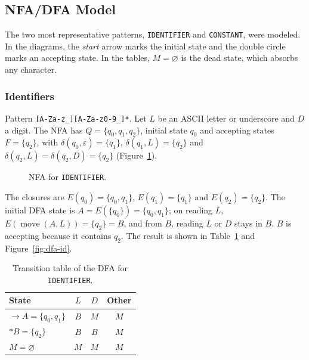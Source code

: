 \documentclass[11pt,letterpaper]{article}
\newcommand{\tok}[1]{\texttt{#1}}
\begin{document}
\subsection{NFA/DFA Model}

The two most representative patterns, \tok{IDENTIFIER} and \tok{CONSTANT},
were modeled. In the diagrams, the \emph{start} arrow marks the initial state
and the double circle marks an accepting state. In the tables,
$M=\varnothing$ is the dead state, which absorbs any character.

\subsubsection{Identifiers}

Pattern \texttt{[A-Za-z\_][A-Za-z0-9\_]*}. Let $L$ be an ASCII letter or
underscore and $D$ a digit. The NFA has $Q=\{q_0,q_1,q_2\}$, initial state
$q_0$ and accepting states $F=\{q_2\}$, with
$\delta(q_0,\varepsilon)=\{q_1\}$, $\delta(q_1,L)=\{q_2\}$ and
$\delta(q_2,L)=\delta(q_2,D)=\{q_2\}$ (Figure~\ref{fig:nfa-id}).

\begin{figure}[H]
\centering
{}
\caption{NFA for \tok{IDENTIFIER}.}
\label{fig:nfa-id}
\end{figure}

The closures are $E(q_0)=\{q_0,q_1\}$, $E(q_1)=\{q_1\}$ and
$E(q_2)=\{q_2\}$. The initial DFA state is $A=E(\{q_0\})=\{q_0,q_1\}$; on
reading $L$, $E(\operatorname{move}(A,L))=\{q_2\}=B$, and from $B$, reading
$L$ or $D$ stays in $B$. $B$ is accepting because it contains $q_2$. The
result is shown in Table~\ref{tab:dfa-id} and Figure~\ref{fig:dfa-id}.

\begin{table}[H]
\centering
\begin{tabular}{lccc}
\toprule
State & $L$ & $D$ & Other \\
\midrule
$\to A=\{q_0,q_1\}$ & $B$ & $M$ & $M$ \\
$*B=\{q_2\}$        & $B$ & $B$ & $M$ \\
$M=\varnothing$     & $M$ & $M$ & $M$ \\
\bottomrule
\end{tabular}
\caption{Transition table of the DFA for \tok{IDENTIFIER}.}
\label{tab:dfa-id}
\end{table}
\end{document}
